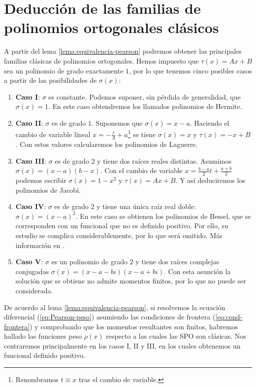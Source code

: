 \section{Deducción de las familias de polinomios ortogonales clásicos}
\label{section:deduccion-clasicos}

A partir del lema \ref{lema:equivalencia-pearson} podremos obtener las principales familias clásicas de polinomios ortogonales. Hemos impuesto que $\tau(x)=Ax+B$ sea un polinomio de grado exactamente $1$, por lo que tenemos cinco posibles casos a partir de las posibilidades de $\sigma(x)$:

\begin{enumerate}
    \item \textbf{Caso I}: $\sigma$ es constante. Podemos suponer, sin pérdida de generalidad, que $\sigma(x) = 1$. En este caso obtendremos los llamados polinomios de Hermite.
    \item \textbf{Caso II}: $\sigma$ es de grado $1$. Suponemos que $\sigma(x) = x-a$. Haciendo el cambio de variable lineal $x = -\frac t A+a$\footnote{Renombramos $t\equiv x$ tras el cambio de variable.} se tiene $\sigma(x) = x$ y $\tau(x)=-x+B$. Con estos valores calcularemos los polinomios de Laguerre.
    \item \textbf{Caso III}: $\sigma$ es de grado $2$ y tiene dos raíces reales distintas. Asumimos\linebreak $\sigma(x) = (x-a)(b-x)$. Con el cambio de variable $x = \frac{b-a}{2}t + \frac{a+b}{2}$ podemos escribir $\sigma(x)=1-x^2$ y $\tau(x)=Ax+B$. Y así deduciremos los polinomios de Jacobi.
    \item \textbf{Caso IV}: $\sigma$ es de grado $2$ y tiene una única raíz real doble: $\sigma(x) = (x-a)^2$. En este caso se obtienen los polinomios de Bessel, que se corresponden con un funcional que no es definido positivo. Por ello, su estudio se complica considerablemente, por lo que será omitido. Más información en \cite{Bessel-polynomials}.  
    \item \textbf{Caso V}: $\sigma$ es un polinomio de grado $2$ y tiene dos raíces complejas conjugadas \linebreak $\sigma(x) = (x-a-bi)(x-a+bi)$. Con esta asunción la solución que se obtiene no admite momentos finitos, por lo que no puede ser considerada.
\end{enumerate}
De acuerdo al lema \ref{lema:equivalencia-pearson}, si resolvemos la ecuación diferencial (\ref{eq:Pearson-peso}) asumiendo las condiciones de frontera (\ref{eq:cond-frontera}) y comprobando que los momentos resultantes son finitos, habremos hallado las funciones peso $\rho(x)$ respecto a las cuales las SPO son clásicas. Nos centraremos principalmente en los casos I, II y III, en los cuales obtenemos un funcional definido positivo.

